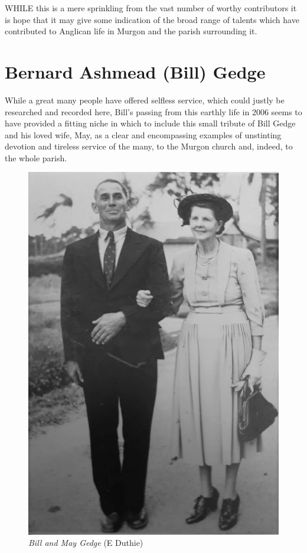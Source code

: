 \lettrine[lines=3]{W}{HILE}
 this is a mere sprinkling from the vast number of worthy contributors it is hope that it may give some indication of the broad range of talents which have contributed to Anglican life in Murgon and the parish surrounding it.

\section{Bernard Ashmead (Bill) Gedge}



While a great many people have offered selfless service, which could justly be researched and recorded here, Bill's passing from this earthly life in 2006 seems to have provided a fitting niche in which to include this small tribute of Bill Gedge and his loved wife, May, as a clear and encompassing examples of unstinting devotion and tireless service of the many, to the Murgon church and, indeed, to the whole parish.









\begin{figure}
\begin{center}
\includegraphics[width=.7\linewidth,center]{../images/BillAndMayGedge.jpg}
\caption{{\itshape Bill and May Gedge} {\scriptsize(E Duthie)}}
\end{center}
\end{figure}




